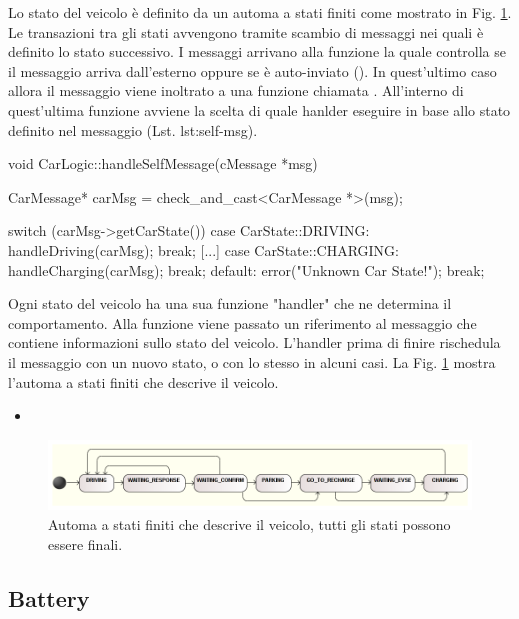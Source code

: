 Lo stato del veicolo è definito da un automa a stati finiti come mostrato in Fig. \ref{fig:car-fsmd}. Le transazioni tra gli stati avvengono tramite scambio di messaggi nei quali è definito lo stato successivo. I messaggi arrivano alla funzione  la quale controlla se il messaggio arriva dall'esterno oppure se è auto-inviato (). In quest'ultimo caso allora il messaggio viene inoltrato a una funzione chiamata . All'interno di quest'ultima funzione avviene la scelta di quale hanlder eseguire in base allo stato definito nel messaggio (Lst. lst:self-msg).

\begin{cpp}[caption={Funzione di scelta dello stato}, label={lst:self-msg}]
void CarLogic::handleSelfMessage(cMessage *msg) {
	CarMessage* carMsg = check_and_cast<CarMessage *>(msg);
	
	switch (carMsg->getCarState()) {
		case CarState::DRIVING:
			handleDriving(carMsg);
			break;
		[...]
		case CarState::CHARGING:
			handleCharging(carMsg);
			break;
		default:
			error("Unknown Car State!");
			break;
	}	
}
\end{cpp}

Ogni stato del veicolo ha una sua funzione "handler" che ne determina il comportamento. Alla funzione viene passato un riferimento al messaggio che contiene informazioni sullo stato del veicolo. L'handler prima di finire rischedula il messaggio con un nuovo stato, o con lo stesso in alcuni casi. La Fig. \ref{fig:car-fsmd} mostra l'automa a stati finiti che descrive il veicolo. 

\begin{itemize}
	\item
\end{itemize}

\begin{figure}
	\centering
	\includegraphics[width=1.0\textwidth]{assets/car-fsmd.png}
	\caption{Automa a stati finiti che descrive il veicolo, tutti gli stati possono essere finali.}
	\label{fig:car-fsmd}
\end{figure}

\subsection{Battery}\label{sec:battery}


